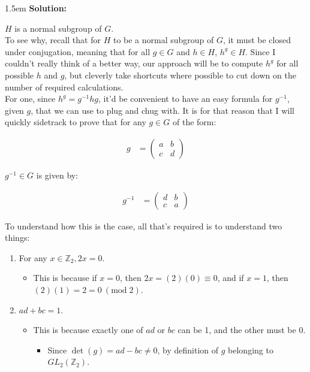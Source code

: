 \documentclass{article}
\newenvironment{solution}{
	\vspace{.5em}
	\par
	\begin{adjustwidth}{1.5em}{}
	\textbf{{Solution:}}
	\par
	\vspace{.5em}
}{
	\vspace{1em}
	\end{adjustwidth}
	\setcounter{step}{0}
}
\newcounter{step}
\renewcommand{\mod}[1]{\ (\text{mod} \; {#1})}
\begin{document}
\begin{solution}
	$H$ is a normal subgroup of $G$. \\

	To see why, recall that for $H$ to be a normal subgroup of $G$, it must be closed under conjugation, meaning that for all $g \in G$ and $h \in H$, $h^{g} \in H$. Since I couldn't really think of a better way, our approach will be to compute $h^{g}$ for all possible $h$ and $g$, but cleverly take shortcuts where possible to cut down on the number of required calculations. \\

	For one, since $h^{g} = g^{-1}hg$, it'd be convenient to have an easy formula for $g^{-1}$, given $g$, that we can use to plug and chug with. It is for that reason that I will quickly sidetrack to prove that for any $g \in G$ of the form:

	\begin{align*}
		g &= \begin{pmatrix}
			a & b \\
			c & d
		\end{pmatrix}
	\end{align*}
	
	$g^{-1} \in G$ is given by:

	\begin{align*}
		g^{-1} &= \begin{pmatrix}
			d & b \\
			c & a
		\end{pmatrix}
	\end{align*}
	
	To understand how this is the case, all that's required is to understand two things:
	\begin{enumerate}
		\item For any $x \in \mathbb{Z}_{2}, 2x = 0$.
		\begin{itemize}
			\item This is because if $x = 0$, then $2x = (2)(0) \equiv 0$, and if $x = 1$, then $(2)(1) = 2 = 0 \mod{2}$.
		\end{itemize}
		\item $ad + bc = 1$.
		\begin{itemize}
			\item This is because exactly one of $ad$ or $bc$ can be 1, and the other must be 0.
			\begin{itemize}
				\item Since $\det(g) = ad - bc \neq 0$, by definition of $g$ belonging to $GL_{2}(\mathbb{Z}_{2})$. \\
			\end{itemize}
		\end{itemize}
	\end{enumerate}


\end{solution}
\end{document}
